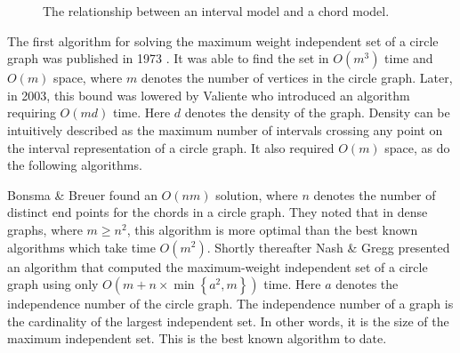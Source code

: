 \documentclass[12pt, a4paper]{article}
\begin{document}
\begin{figure}
\begin{center}
\end{center}
\caption{The relationship between an interval model and a chord model.}
\label{interval2circle}
\end{figure}

The first algorithm for solving the maximum weight independent set of a circle graph was published in 1973 \cite{gavril1973algorithms}. It was able to find the set in $O(m^3)$ time and $O(m)$ space, where $m$ denotes the number of vertices in the circle graph. Later, in 2003, this bound was lowered by Valiente \cite{valiente2003new} who introduced an algorithm requiring $O(md)$ time. Here $d$ denotes the density of the graph. Density can be intuitively described as the maximum number of intervals crossing any point on the interval representation of a circle graph.  It also required $O(m)$ space, as do the following algorithms.

Bonsma \& Breuer \cite{bonsma2012counting} found an $O(nm)$ solution, where $n$ denotes the number of distinct end points for the chords in a circle graph. They noted that in dense graphs, where $m \geq n^2$, this algorithm is more optimal than the best known algorithms which take time $O(m^2)$. Shortly thereafter Nash \& Gregg \cite{nash2013new} presented an algorithm that computed the maximum-weight independent set of a circle graph using only $O(m + n\times \min \left\lbrace a^2, m\right\rbrace)$ time. Here $a$ denotes the independence number of the circle graph. The independence number of a graph is the cardinality of the largest independent set. In other words, it is the size of the maximum independent set. This is the best known algorithm to date.
\end{document}
